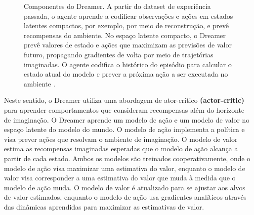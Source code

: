 \begin{figure}[h]
 \centering
   \qquad
  \qquad
   \caption{Componentes do Dreamer. {} A partir do dataset de experiência passada, o agente aprende a codificar observações e ações em estados latentes compactos, por exemplo, por meio de reconstrução, e prevê recompensas do ambiente.
    {} No espaço latente compacto, o Dreamer prevê valores de estado e ações que maximizam as previsões de valor futuro, propagando gradientes de volta por meio de trajetórias imaginadas.
    {} O agente codifica o histórico do episódio para calcular o estado atual do modelo e prever a próxima ação a ser executada no ambiente \cite{dream_v1}.}
  \label{fig:componentes_dreamer}
\end{figure}

Neste sentido,  o Dreamer utiliza uma abordagem de ator-crítico \textbf{(actor-critic)} para aprender comportamentos que consideram recompensas além do horizonte de imaginação. O Dreamer aprende um modelo de ação e um modelo de valor no espaço latente do modelo do mundo. O modelo de ação implementa a política e visa prever ações que resolvam o ambiente de imaginação. O modelo de valor estima as recompensas imaginadas esperadas que o modelo de ação alcança a partir de cada estado. Ambos os modelos são treinados cooperativamente, onde o modelo de ação visa maximizar uma estimativa do valor, enquanto o modelo de valor visa corresponder a uma estimativa do valor que muda à medida que o modelo de ação muda. O modelo de valor é atualizado para se ajustar aos alvos de valor estimados, enquanto o modelo de ação usa gradientes analíticos através das dinâmicas aprendidas para maximizar as estimativas de valor.

